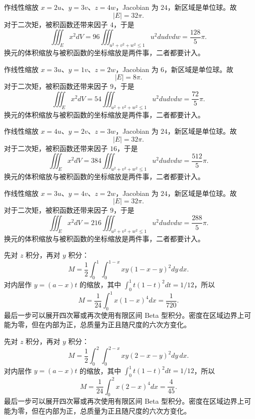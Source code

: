 \documentclass[12pt,fontset=fandol]{ctexart}
\begin{document}
\begin{solve}\label{ans:c39q15}
作线性缩放 $x=2u$、$y=3v$、$z=4w$，Jacobian 为 $24$，新区域是单位球。故
\[
|E|=32\pi.
\]
对于二次矩，被积函数还带来因子 $4$，于是
\[
\iiint_Ex^2dV=96\iiint_{u^2+v^2+w^2\le1}u^2dudvdw=\frac{128}{5}\pi.
\]
换元的体积缩放与被积函数的坐标缩放是两件事，二者都要计入。
\end{solve}

\begin{solve}\label{ans:c39q16}
作线性缩放 $x=3u$、$y=1v$、$z=2w$，Jacobian 为 $6$，新区域是单位球。故
\[
|E|=8\pi.
\]
对于二次矩，被积函数还带来因子 $9$，于是
\[
\iiint_Ex^2dV=54\iiint_{u^2+v^2+w^2\le1}u^2dudvdw=\frac{72}{5}\pi.
\]
换元的体积缩放与被积函数的坐标缩放是两件事，二者都要计入。
\end{solve}

\begin{solve}\label{ans:c39q17}
作线性缩放 $x=4u$、$y=2v$、$z=3w$，Jacobian 为 $24$，新区域是单位球。故
\[
|E|=32\pi.
\]
对于二次矩，被积函数还带来因子 $16$，于是
\[
\iiint_Ex^2dV=384\iiint_{u^2+v^2+w^2\le1}u^2dudvdw=\frac{512}{5}\pi.
\]
换元的体积缩放与被积函数的坐标缩放是两件事，二者都要计入。
\end{solve}

\begin{solve}\label{ans:c39q18}
作线性缩放 $x=3u$、$y=4v$、$z=2w$，Jacobian 为 $24$，新区域是单位球。故
\[
|E|=32\pi.
\]
对于二次矩，被积函数还带来因子 $9$，于是
\[
\iiint_Ex^2dV=216\iiint_{u^2+v^2+w^2\le1}u^2dudvdw=\frac{288}{5}\pi.
\]
换元的体积缩放与被积函数的坐标缩放是两件事，二者都要计入。
\end{solve}

\begin{solve}\label{ans:c39q19}
先对 $z$ 积分，再对 $y$ 积分：
\[
M=\frac12\int_0^{1}\int_0^{1-x}xy(1-x-y)^2dy\,dx.
\]
对内层作 $y=(a-x)t$ 的缩放，其中 $\int_0^1t(1-t)^2dt=1/12$，所以
\[
M=\frac1{24}\int_0^{1}x(1-x)^4dx=\frac{1}{720}.
\]
最后一步可以展开四次幂或再次使用有限区间 Beta 型积分。密度在区域边界上可能为零，但在内部为正，总质量为正且随尺度的六次方变化。
\end{solve}

\begin{solve}\label{ans:c39q20}
先对 $z$ 积分，再对 $y$ 积分：
\[
M=\frac12\int_0^{2}\int_0^{2-x}xy(2-x-y)^2dy\,dx.
\]
对内层作 $y=(a-x)t$ 的缩放，其中 $\int_0^1t(1-t)^2dt=1/12$，所以
\[
M=\frac1{24}\int_0^{2}x(2-x)^4dx=\frac{4}{45}.
\]
最后一步可以展开四次幂或再次使用有限区间 Beta 型积分。密度在区域边界上可能为零，但在内部为正，总质量为正且随尺度的六次方变化。
\end{solve}
\end{document}
